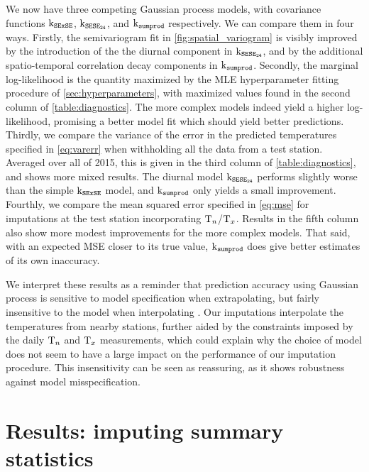 We now have three competing Gaussian process models, with covariance functions \(\operatorname{k_{\mathtt{SExSE}}}\), \(\operatorname{k_{\mathtt{SESE_{24}}}}\), and \(\operatorname{k_{\mathtt{sumprod}}}\) respectively. 
We can compare them in four ways.
Firstly, the semivariogram fit in \autoref{fig:spatial_variogram} is visibly improved by the introduction of the the diurnal component in \(\operatorname{k_{\mathtt{SESE_{24}}}}\), and by the additional spatio-temporal correlation decay components in \(\operatorname{k_{\mathtt{sumprod}}}\).
Secondly, the marginal log-likelihood is the quantity maximized by the MLE hyperparameter fitting procedure of \autoref{sec:hyperparameters}, with maximized values found in the second column of \autoref{table:diagnostics}.
The more complex models indeed yield a higher log-likelihood, promising a better model fit which should yield better predictions.
Thirdly, we compare the variance of the error in the predicted temperatures specified in \autoref{eq:varerr} when withholding all the data from a test station. 
Averaged over all of 2015, this is given in the third column of \autoref{table:diagnostics}, and shows more mixed results.
The diurnal model \(\operatorname{k_{\mathtt{SESE_{24}}}}\) performs slightly worse than the simple \(\operatorname{k_{\mathtt{SExSE}}}\) model, and \(\operatorname{k_{\mathtt{sumprod}}}\) only yields a small improvement.
Fourthly, we compare the mean squared error specified in \autoref{eq:mse} for imputations at the test station incorporating \(\mathrm{T}_{n}\)/\(\mathrm{T}_{x}\). 
Results in the fifth column also show more modest improvements for the more complex models.
That said, with an expected MSE closer to its true value, \(\operatorname{k_{\mathtt{sumprod}}}\) does give better estimates of its own inaccuracy.

We interpret these results as a reminder that prediction accuracy using Gaussian process is sensitive to model specification when extrapolating, but fairly insensitive to the model when interpolating \citep{stein2012interpolation}.
Our imputations interpolate the temperatures from nearby stations, further aided by the constraints imposed by the daily \(\mathrm{T}_{n}\) and \(\mathrm{T}_{x}\) measurements, which could explain why the choice of model does not seem to have a large impact on the performance of our imputation procedure.
This insensitivity can be seen as reassuring, as it shows robustness against model misspecification.

\section{Results: imputing summary statistics}
\label{sec:results}

